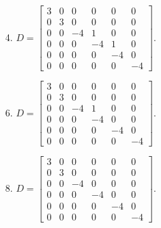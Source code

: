 \documentclass[12pt]{article}
\begin{document}
\begin{multicols}{2}
\begin{enumerate}
	\item[4.] $D = \begin{bmatrix}
	3 & 0 & 0 & 0 & 0 & 0 \\
	0 & 3 & 0 & 0 & 0 & 0 \\
	0 & 0 & -4 & 1 & 0 & 0 \\
	0 & 0 & 0 & -4 & 1 & 0 \\
	0 & 0 & 0 & 0 & -4 & 0 \\
	0 & 0 & 0 & 0 & 0 & -4
	\end{bmatrix}$.
	
	\item[6.] $D = \begin{bmatrix}
	3 & 0 & 0 & 0 & 0 & 0 \\
	0 & 3 & 0 & 0 & 0 & 0 \\
	0 & 0 & -4 & 1 & 0 & 0 \\
	0 & 0 & 0 & -4 & 0 & 0 \\
	0 & 0 & 0 & 0 & -4 & 0 \\
	0 & 0 & 0 & 0 & 0 & -4
	\end{bmatrix}$.
	
	\item[8.] $D = \begin{bmatrix}
	3 & 0 & 0 & 0 & 0 & 0 \\
	0 & 3 & 0 & 0 & 0 & 0 \\
	0 & 0 & -4 & 0 & 0 & 0 \\
	0 & 0 & 0 & -4 & 0 & 0 \\
	0 & 0 & 0 & 0 & -4 & 0 \\
	0 & 0 & 0 & 0 & 0 & -4
	\end{bmatrix}$.
	\end{enumerate}
\end{multicols}

	\newpage
	
\end{document}
